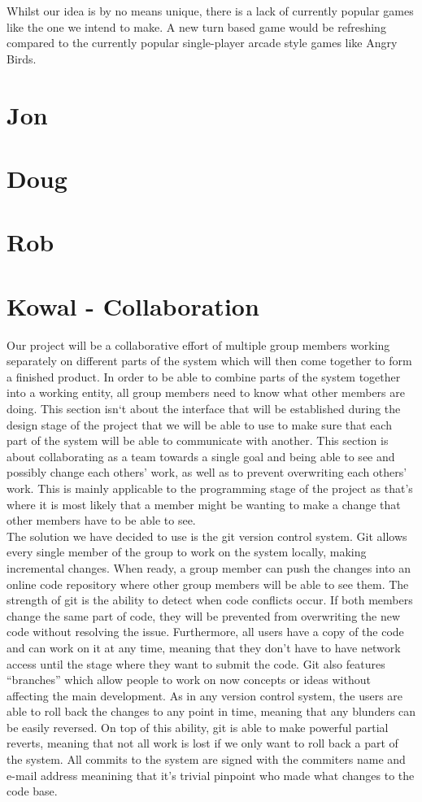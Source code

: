 \documentclass[10pt,a4paper,oneside]{report}
\begin{document}
Whilst our idea is by no means unique, there is a lack of currently popular games like the one we intend to make. A new turn based game would be refreshing compared to the currently popular single-player arcade style games like Angry Birds.
\clearpage
\section*{Jon}
\clearpage
\section*{Doug}
\clearpage
\section*{Rob}
\clearpage
\section*{Kowal - Collaboration}

Our project will be a collaborative effort of multiple group members working separately on different parts of the system which will then come together to form a finished product. In order to be able to combine parts of the system together into a working entity, all group members need to know what other members are doing. This section isn`t about the interface that will be established during the design stage of the project that we will be able to use to make sure that each part of the system will be able to communicate with another. This section is about collaborating as a team towards a single goal and being able to see and possibly change each others' work, as well as to prevent overwriting each others' work. This is mainly applicable to the programming stage of the project as that's where it is most likely that a member might be wanting to make a change that other members have to be able to see. \\


The solution we have decided to use is the git version control system. Git allows every single member of the group to work on the system locally, making incremental changes. When ready, a group member can push the changes into an online code repository where other group members will be able to see them. The strength of git is the ability to detect when code conflicts occur. If both members change the same part of code, they will be prevented from overwriting the new code without resolving the issue. Furthermore, all users have a copy of the code and can work on it at any time, meaning that they don't have to have network access until the stage where they want to submit the code. Git also features ``branches'' which allow people to work on now concepts or ideas without affecting the main development. As in any version control system, the users are able to roll back the changes to any point in time, meaning that any blunders can be easily reversed. On top of this ability, git is able to make powerful partial reverts, meaning that not all work is lost if we only want to roll back a part of the system. All commits to the system are signed with the commiters name and e-mail address meanining that it's trivial pinpoint who made what changes to the code base.\\
\end{document}
